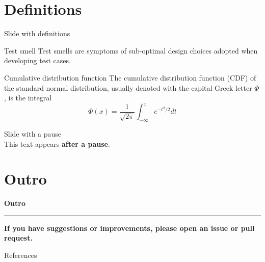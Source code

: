 \documentclass[aspectratio=169, 10pt]{beamer}
\begin{document}
\section{Definitions}
\begin{frame}[fragile]{Slide with definitions}
    \begin{defbox}{Test smell \cite{pontillo2024}}
        Test smells are symptoms of sub-optimal design choices adopted when developing test cases.
    \end{defbox}
    \vspace{0.2cm}
    \begin{defbox}{Cumulative distribution function\cite{wiki:normal_dist}}
        The cumulative distribution function (CDF) of the standard normal distribution, usually denoted with the capital Greek letter $\Phi$, is the integral 
        \begin{equation}
            \Phi(x) = \frac{1}{\sqrt{2\pi}}\int_{-\infty}^{x}{e^{-t^2 / 2}dt}
        \end{equation}
    \end{defbox}
\end{frame}


\begin{frame}[fragile]{Slide with a pause}
    \lipsum[1][1-5]\\[2ex]
    \pause
    \justifying
    This text appears \textbf{after a pause}. \lipsum[1][6-15]
\end{frame}



{
    \AtBeginSection{}
    \section{Outro}
    \begin{frame}
        \centering
        {\huge \textbf{Outro}}
        \vspace{15pt}
        \hrule
        \vspace{15pt}
        {\normalsize \textbf{If you have suggestions or improvements, please open an issue or pull request.}}
    \end{frame}
}


\renewcommand{\bibsection}{}  %
\begin{frame}{References}

\scriptsize

\end{frame}
\end{document}
